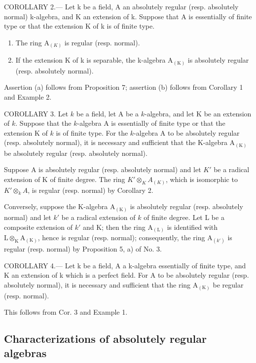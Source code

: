 COROLLARY 2.--- Let k be a field, A an absolutely regular (resp. absolutely normal) k-algebra, and K an extension of k. Suppose that A is essentially of finite type or that the extension K of k is of finite type.

\begin{enumerate}
\def\labelenumi{\alph{enumi})}
\item
  The ring \(\mathrm{A}_{(K)}\) is regular (resp. normal).
\item
  If the extension K of k is separable, the k-algebra \(\mathrm{A}_{(\mathrm{K})}\) is absolutely regular (resp. absolutely normal).
\end{enumerate}

Assertion (a) follows from Proposition 7; assertion (b) follows from Corollary 1 and Example 2.

COROLLARY 3. Let \(k\) be a field, let A be a \(k\)-algebra, and let K be an extension of \(k\). Suppose that the \(k\)-algebra A is essentially of finite type or that the extension K of \(k\) is of finite type. For the \(k\)-algebra A to be absolutely regular (resp. absolutely normal), it is necessary and sufficient that the K-algebra \(\mathrm{A}_{(\mathrm{K})}\) be absolutely regular (resp. absolutely normal).

Suppose A is absolutely regular (resp. absolutely normal) and let \(K'\) be a radical extension of K of finite degree. The ring \(K'\otimes_{K}A_{(K)}\), which is isomorphic to \(K'\otimes_{k}A\), is regular (resp. normal) by Corollary 2.

Conversely, suppose the K-algebra \(\mathrm{A}_{(\mathrm{K})}\) is absolutely regular (resp. absolutely normal) and let \(k'\) be a radical extension of \(k\) of finite degree. Let L be a composite extension of \(k'\) and K; then the ring \(\mathrm{A}_{(\mathrm{L})}\) is identified with \(\mathrm{L} \otimes_{\mathrm{K}} \mathrm{A}_{(\mathrm{K})}\), hence is regular (resp. normal); consequently, the ring \(\mathrm{A}_{(k')}\) is regular (resp. normal) by Proposition 5, a) of No. 3.

COROLLARY 4.--- Let k be a field, A a k-algebra essentially of finite type, and K an extension of k which is a perfect field. For A to be absolutely regular (resp. absolutely normal), it is necessary and sufficient that the ring \(\mathrm{A}_{(\mathrm{K})}\) be regular (resp. normal).

This follows from Cor. 3 and Example 1.

\subsection{Characterizations of absolutely regular algebras}

